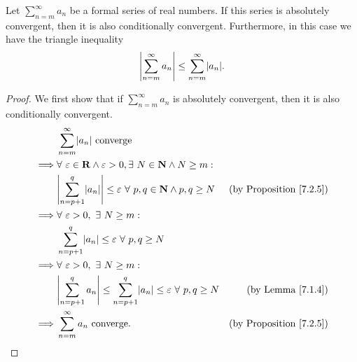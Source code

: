 \begin{proposition}\label{7.2.9}
    Let \(\sum_{n = m}^\infty a_n\) be a formal series of real numbers.
    If this series is absolutely convergent, then it is also conditionally convergent.
    Furthermore, in this case we have the triangle inequality
    \[
        \abs*{\sum_{n = m}^\infty a_n} \leq \sum_{n = m}^\infty \abs*{a_n}.
    \]
\end{proposition}

\begin{proof}
    We first show that if \(\sum_{n = m}^\infty a_n\) is absolutely convergent, then it is also conditionally convergent.
    \begin{align*}
                 & \sum_{n = m}^\infty \abs*{a_n} \text{ converge}                                                                                               \\
        \implies & \forall\ \varepsilon \in \mathbf{R} \land \varepsilon > 0, \exists\ N \in \mathbf{N} \land N \geq m :                                         \\
                 & \abs*{\sum_{n = p + 1}^q \abs*{a_n}} \leq \varepsilon\ \forall\ p, q \in \mathbf{N} \land p, q \geq N   & \text{(by Proposition \ref{7.2.5})} \\
        \implies & \forall\ \varepsilon > 0, \ \exists\ N \geq m :                                                                                               \\
                 & \sum_{n = p + 1}^q \abs*{a_n} \leq \varepsilon\ \forall\ p, q \geq N                                                                          \\
        \implies & \forall\ \varepsilon > 0, \ \exists\ N \geq m :                                                                                               \\
                 & \abs*{\sum_{n = p + 1}^q a_n} \leq \sum_{n = p + 1}^q \abs*{a_n} \leq \varepsilon\ \forall\ p, q \geq N & \text{(by Lemma \ref{7.1.4})}       \\
        \implies & \sum_{n = m}^\infty a_n \text{ converge}.                                                               & \text{(by Proposition \ref{7.2.5})}
    \end{align*}


\end{proof}
